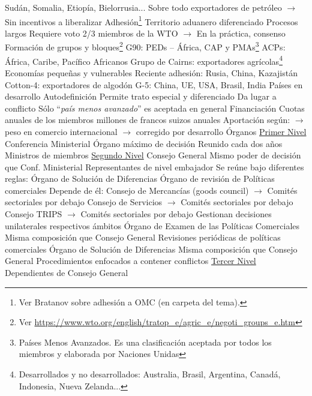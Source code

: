 \documentclass{nuevotema}
\begin{document}
\begin{esquemal}
				\4[] Sudán, Somalia, Etiopía, Bielorrusia...
				\4[] Sobre todo exportadores de petróleo
				\4[] $\to$ Sin incentivos a liberalizar
				\4 Adhesión\footnote{Ver Bratanov sobre adhesión a OMC (en carpeta del tema).}
				\4[] Territorio aduanero diferenciado
				\4[] Procesos largos
				\4[] Requiere voto 2/3 miembros de la WTO
				\4[] $\to$ En la práctica, consenso
				\4 Formación de grupos y bloques\footnote{Ver \url{https://www.wto.org/english/tratop_e/agric_e/negoti_groups_e.htm}}
				\4[] G90: PEDs -- África, CAP y PMAs\footnote{Países Menos Avanzados. Es una clasificación aceptada por todos los miembros y elaborada por Naciones Unidas}
				\4[] ACPs: África, Caribe, Pacífico
				\4[] Africanos
				\4[] Grupo de Cairns: exportadores agrícolas\footnote{Desarrollados y no desarrollados: Australia, Brasil, Argentina, Canadá, Indonesia, Nueva Zelanda...}
				\4[] Economías pequeñas y vulnerables
				\4[] Reciente adhesión: Rusia, China, Kazajistán
				\4[] Cotton-4: exportadores de algodón
				\4[] G-5: China, UE, USA, Brasil, India
				\4 Países en desarrollo
				\4[] Autodefinición
				\4[] Permite trato especial y diferenciado
				\4[] Da lugar a conflicto
				\4[] Sólo ``\textit{país menos avanzado}'' es aceptada en general
			\3 Financiación
				\4 Cuotas anuales de los miembros
				 millones de francos suizos anuales
				\4 Aportación según:
				\4[] $\to$ peso en comercio internacional
				\4[] $\to$ corregido por desarrollo
			\3 Órganos
			\3[] \underline{Primer Nivel}
			\3[I] Conferencia Ministerial
				\4 Órgano máximo de decisión
				\4 Reunido cada dos años
				\4 Ministros de miembros
			\3 \underline{Segundo Nivel}
			\3[II] Consejo General
				\4 Mismo poder de decisión que Conf. Ministerial
				\4 Representantes de nivel embajador
				\4 Se reúne bajo diferentes reglas:
				\4[] Órgano de Solución de Diferencias
				\4[] Órgano de revisión de Políticas comerciales
				\4 Depende de él:
				\4[] Consejo de Mercancías (goods council)
				\4[] $\to$ Comités sectoriales por debajo
				\4[] Consejo de Servicios
				\4[] $\to$ Comités sectoriales por debajo
				\4[] Consejo TRIPS
				\4[] $\to$ Comités sectoriales por debajo
				\4[$\then$] Gestionan decisiones unilaterales respectivos ámbitos
			\3[] Órgano de Examen de las Políticas Comerciales
				\4 Misma composición que Consejo General
				\4 Revisiones periódicas de políticas comerciales
			\3[] Órgano de Solución de Diferencias
				\4 Misma composición que Consejo General
				\4 Procedimientos enfocados a contener conflictos
			\3[] \underline{Tercer Nivel}
				\4 Dependientes de Consejo General

\end{esquemal}
\end{document}
